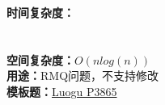 \textbf{时间复杂度：}\\
\\
\\
\textbf{空间复杂度：}$O(nlog(n))$\\
\textbf{用途：}RMQ问题，不支持修改\\
\textbf{模板题：}\href{https://www.luogu.com.cn/problem/P3865}{Luogu P3865}